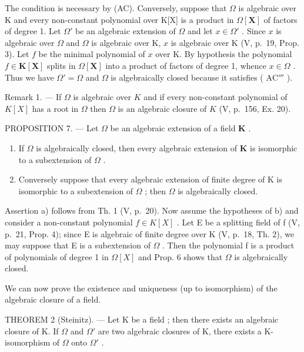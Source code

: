 The condition is necessary by (AC). Conversely, suppose that \(\Omega\) is algebraic over K and every non-constant polynomial over K{[}X{]} is a product in \(\Omega[\mathbf{X}]\) of factors of degree 1. Let \(\Omega'\) be an algebraic extension of \(\Omega\) and let \(x \in \Omega'\) . Since \(x\) is algebraic over \(\Omega\) and \(\Omega\) is algebraic over K, \(x\) is algebraic over K (V, p.~19, Prop. 3). Let \(f\) be the minimal polynomial of \(x\) over K. By hypothesis the polynomial \(f \in \mathbf{K}[\mathbf{X}]\) splits in \(\Omega[\mathbf{X}]\) into a product of factors of degree 1, whence \(x \in \Omega\) . Thus we have \(\Omega' = \Omega\) and \(\Omega\) is algebraically closed because it satisfies ( \(\mathrm{AC}'''\) ).

Remark 1. --- If \(\Omega\) is algebraic over \(K\) and if every non-constant polynomial of \(K[X]\) has a root in \(\Omega\) then \(\Omega\) is an algebraic closure of \(K\) (V, p.~156, Ex. 20).

PROPOSITION 7. --- Let \(\Omega\) be an algebraic extension of a field \(\mathbf{K}\) .

\begin{enumerate}
\def\labelenumi{\alph{enumi})}
\item
  If \(\Omega\) is algebraically closed, then every algebraic extension of \(\mathbf{K}\) is isomorphic to a subextension of \(\Omega\) .
\item
  Conversely suppose that every algebraic extension of finite degree of K is isomorphic to a subextension of \(\Omega\) ; then \(\Omega\) is algebraically closed.
\end{enumerate}

Assertion a) follows from Th. 1 (V, p.~20). Now assume the hypotheses of b) and consider a non-constant polynomial \(f \in K[X]\) . Let E be a splitting field of f (V, p.~21, Prop. 4); since E is algebraic of finite degree over K (V, p.~18, Th. 2), we may suppose that E is a subextension of \(\Omega\) . Then the polynomial f is a product of polynomials of degree 1 in \(\Omega[X]\) and Prop. 6 shows that \(\Omega\) is algebraically closed.

We can now prove the existence and uniqueness (up to isomorphism) of the algebraic closure of a field.

THEOREM 2 (Steinitz). --- Let K be a field ; then there exists an algebraic closure of K. If \(\Omega\) and \(\Omega'\) are two algebraic closures of K, there exists a K-isomorphism of \(\Omega\) onto \(\Omega'\) .

